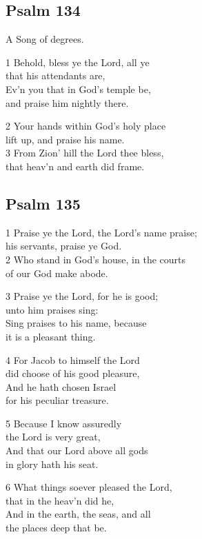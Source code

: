 \subsection*{Psalm 134}

A Song of degrees.

1 Behold, bless ye the Lord, all ye\\
that his attendants are,\\
Ev’n you that in God’s temple be,\\
and praise him nightly there.

2 Your hands within God’s holy place\\
lift up, and praise his name.\\
3 From Zion’ hill the Lord thee bless,\\
that heav’n and earth did frame.

\begin{center}
\quad{}\quad{}
\end{center}

\subsection*{Psalm 135}

1 Praise ye the Lord, the Lord’s name praise;\\
his servants, praise ye God.\\
2 Who stand in God’s house, in the courts\\
of our God make abode.

3 Praise ye the Lord, for he is good;\\
unto him praises sing:\\
Sing praises to his name, because\\
it is a pleasant thing.

4 For Jacob to himself the Lord\\
did choose of his good pleasure,\\
And he hath chosen Israel\\
for his peculiar treasure.

5 Because I know assuredly\\
the Lord is very great,\\
And that our Lord above all gods\\
in glory hath his seat.

6 What things soever pleased the Lord,\\
that in the heav’n did he,\\
And in the earth, the seas, and all\\
the places deep that be.

